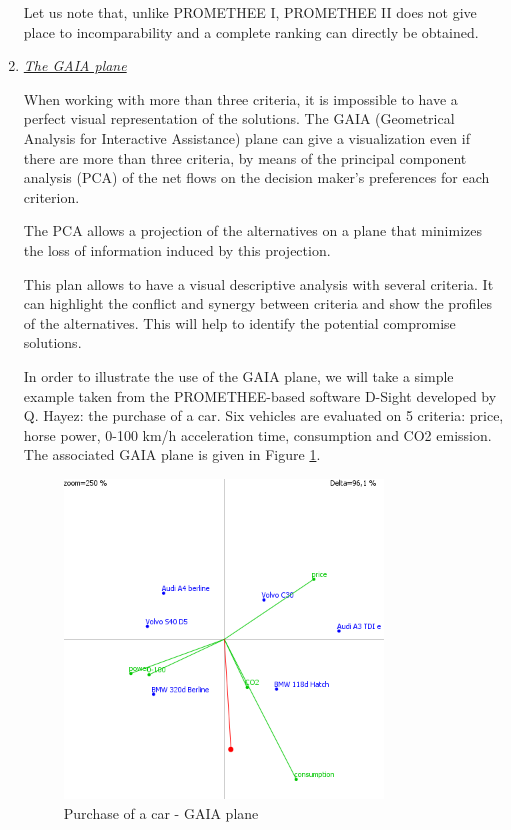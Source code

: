 \begin{enumerate}
Let us note that, unlike PROMETHEE I, PROMETHEE II does not give place to incomparability and a complete ranking can directly be obtained.

\item \textit{\underline{The GAIA plane}}

When working with more than three criteria, it is impossible to have a perfect visual representation of the solutions. The GAIA (Geometrical Analysis for Interactive Assistance) plane can give a visualization even if there are more than three criteria, by means of the principal component analysis (PCA) of the net flows on the decision maker's preferences for each criterion.

The PCA allows a projection of the alternatives on a plane that minimizes the loss of information induced by this projection.

This plan allows to have a visual descriptive analysis with several criteria. It can highlight the conflict and synergy between criteria and show the profiles of the alternatives. This will help to identify the potential compromise solutions.

In order to illustrate the use of the GAIA plane, we will take a simple example taken from the PROMETHEE-based software D-Sight developed by Q. Hayez: the purchase of a car. Six vehicles are evaluated on 5 criteria: price, horse power, 0-100 km/h acceleration time, consumption and CO2 emission. The associated GAIA plane is given in Figure \ref{fig:gaiacar}.

\begin{figure}[h!]
\begin{center}
\includegraphics[width=0.8\textwidth]{gaiacar.png}
\end{center}
\caption{Purchase of a car - GAIA plane}
\label{fig:gaiacar}
\end{figure}


\end{enumerate}

